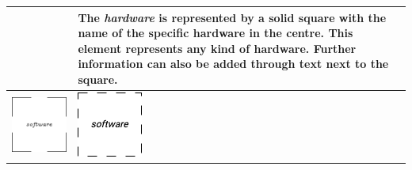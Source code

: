 \begin{longtable}{|m{}|m{}|m{}|}
    & 
    The \textit{hardware} is represented by a solid square with the name of the specific hardware in the centre. This element represents any kind of hardware. Further information can also be added through text next to the square.
    \\\hline
    \centering
    \includegraphics[width=0.75\linewidth]{chapters/4-MDC_model_application/image/bvl-software-o.png}
    &
    \centering
    \includegraphics[width=0.75\linewidth]{chapters/4-MDC_model_application/image/bvl-software.png}

\end{longtable}
